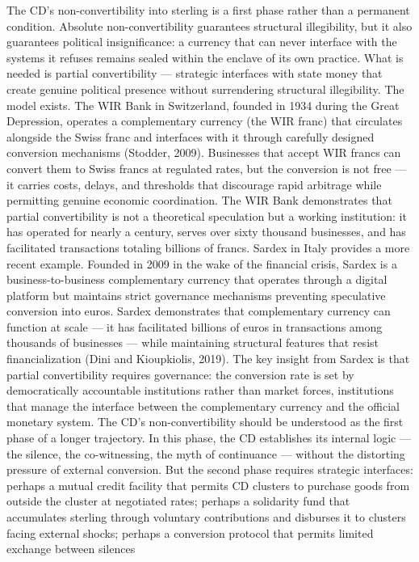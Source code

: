 The CD’s non-convertibility into sterling is a first phase rather than a permanent condition. Absolute non-convertibility guarantees structural illegibility, but it also guarantees political insignificance: a currency that can never interface with the systems it refuses remains sealed within the enclave of its own practice. What is needed is partial convertibility — strategic interfaces with state money that create genuine political presence without surrendering structural illegibility. The model exists. The WIR Bank in Switzerland, founded in 1934 during the Great Depression, operates a complementary currency (the WIR franc) that circulates alongside the Swiss franc and interfaces with it through carefully designed conversion mechanisms (Stodder, 2009). Businesses that accept WIR francs can convert them to Swiss francs at regulated rates, but the conversion is not free — it carries costs, delays, and thresholds that discourage rapid arbitrage while permitting genuine economic coordination. The WIR Bank demonstrates that partial convertibility is not a theoretical speculation but a working institution: it has operated for nearly a century, serves over sixty thousand businesses, and has facilitated transactions totaling billions of francs. Sardex in Italy provides a more recent example. Founded in 2009 in the wake of the financial crisis, Sardex is a business-to-business complementary currency that operates through a digital platform but maintains strict governance mechanisms preventing speculative conversion into euros. Sardex demonstrates that complementary currency can function at scale — it has facilitated billions of euros in transactions among thousands of businesses — while maintaining structural features that resist financialization (Dini and Kioupkiolis, 2019). The key insight from Sardex is that partial convertibility requires governance: the conversion rate is set by democratically accountable institutions rather than market forces, institutions that manage the interface between the complementary currency and the official monetary system. The CD’s non-convertibility should be understood as the first phase of a longer trajectory. In this phase, the CD establishes its internal logic — the silence, the co-witnessing, the myth of continuance — without the distorting pressure of external conversion. But the second phase requires strategic interfaces: perhaps a mutual credit facility that permits CD clusters to purchase goods from outside the cluster at negotiated rates; perhaps a solidarity fund that accumulates sterling through voluntary contributions and disburses it to clusters facing external shocks; perhaps a conversion protocol that permits limited exchange between silences

